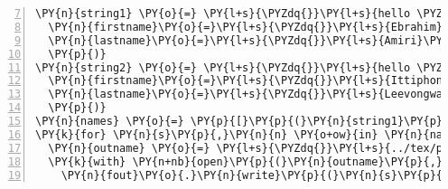 \begin{Verbatim}[commandchars=\\\{\},numbers=left,numbersep=0.5em,firstnumber=7]
\PY{n}{string1} \PY{o}{=} \PY{l+s}{\PYZdq{}}\PY{l+s}{hello \PYZob{}firstname\PYZcb{} \PYZob{}lastname\PYZcb{}}\PY{l+s}{\PYZdq{}}\PY{o}{.}\PY{n}{format}\PY{p}{(}
  \PY{n}{firstname}\PY{o}{=}\PY{l+s}{\PYZdq{}}\PY{l+s}{Ebrahim}\PY{l+s}{\PYZdq{}}\PY{p}{,}
  \PY{n}{lastname}\PY{o}{=}\PY{l+s}{\PYZdq{}}\PY{l+s}{Amiri}\PY{l+s}{\PYZdq{}}\PY{p}{,}
  \PY{p}{)}
\PY{n}{string2} \PY{o}{=} \PY{l+s}{\PYZdq{}}\PY{l+s}{hello \PYZob{}\PYZob{}\PYZob{}firstname\PYZcb{}\PYZcb{}\PYZcb{} \PYZob{}\PYZob{}\PYZob{}lastname\PYZcb{}\PYZcb{}\PYZcb{}}\PY{l+s}{\PYZdq{}}\PY{o}{.}\PY{n}{format}\PY{p}{(}
  \PY{n}{firstname}\PY{o}{=}\PY{l+s}{\PYZdq{}}\PY{l+s}{Ittiphong}\PY{l+s}{\PYZdq{}}\PY{p}{,}
  \PY{n}{lastname}\PY{o}{=}\PY{l+s}{\PYZdq{}}\PY{l+s}{Leevongwat}\PY{l+s}{\PYZdq{}}\PY{p}{,}
  \PY{p}{)}
\PY{n}{names} \PY{o}{=} \PY{p}{[}\PY{p}{(}\PY{n}{string1}\PY{p}{,}\PY{l+s}{\PYZdq{}}\PY{l+s}{amiri}\PY{l+s}{\PYZdq{}}\PY{p}{)}\PY{p}{,} \PY{p}{(}\PY{n}{string2}\PY{p}{,}\PY{l+s}{\PYZdq{}}\PY{l+s}{leev}\PY{l+s}{\PYZdq{}}\PY{p}{)}\PY{p}{]}
\PY{k}{for} \PY{n}{s}\PY{p}{,}\PY{n}{n} \PY{o+ow}{in} \PY{n}{names}\PY{p}{:}
  \PY{n}{outname} \PY{o}{=} \PY{l+s}{\PYZdq{}}\PY{l+s}{../tex/pieces/\PYZob{}\PYZcb{}.tex}\PY{l+s}{\PYZdq{}}\PY{o}{.}\PY{n}{format}\PY{p}{(}\PY{n}{n}\PY{p}{)}
  \PY{k}{with} \PY{n+nb}{open}\PY{p}{(}\PY{n}{outname}\PY{p}{,}\PY{l+s}{\PYZdq{}}\PY{l+s}{w}\PY{l+s}{\PYZdq{}}\PY{p}{)} \PY{k}{as} \PY{n}{fout}\PY{p}{:}
    \PY{n}{fout}\PY{o}{.}\PY{n}{write}\PY{p}{(}\PY{n}{s}\PY{p}{)}
\end{Verbatim}
